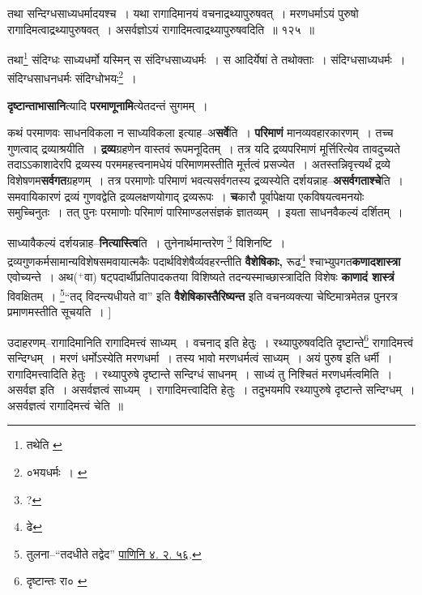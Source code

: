 \documentclass[article,12pt,a4paper]{memoir}
\newcommand{\add}[1]{($^{+}$#1)}
\begin{document}
	  \bigskip
	  \begingroup
	

	  \pstart तथा सन्दिग्धसाध्यधर्मादयश्च । यथा रागादिमानयं वचनाद्रथ्यापुरुषवत् । मरणधर्माऽयं पुरुषो रागादिमत्वाद्रथ्यापुरुषवत् । असर्वज्ञोऽयं रागादिमत्वाद्रथ्यापुरुषवदिति ॥ १२५ ॥
	\pend
      
	  \endgroup
	 

	  \pstart तथा\footnote{तथेति \cite{dp-edE}} संदिग्धः साध्यधर्मो यस्मिन् स संदिग्धसाध्यधर्मः । स आदिर्येषां ते तथोक्ताः । संदिग्धसाध्यधर्मः । संदिग्धसाधनधर्मः संदिग्धोभयः\footnote{०भयधर्मः । \cite{dp-msC}} ।
	\pend
      
	  \endgroup
	

	  \pstart \textbf{दृष्टान्ताभासानि}त्यादि \textbf{परमाणूनामि}त्येतदन्तं सुगमम् ।
	\pend
      

	  \pstart कथं परमाणवः साधनविकला न साध्यविकला इत्याह--अ\textbf{सर्वे}ति । \textbf{परिमाणं} मानव्यवहारकारणम् । तच्च गुणत्वाद् द्रव्याश्रयीति । \textbf{द्रव्य}ग्रहणेन वास्तवं रूपमनूदितम् । तत्र यदि द्रव्यपरिमाणं मूर्त्तिरित्येव तावदुच्यते तदाऽऽकाशादेरपि द्रव्यस्य परममहत्त्वनामधेयं परिमाणमस्तीति मूर्त्तत्वं प्रसज्येत । अतस्तन्निवृत्त्यर्थं द्रव्ये विशेषणम\textbf{सर्वगत}ग्रहणम् । तत्र परमाणोः परिमाणं भवत्यसर्वगतस्य द्रव्यस्येति दर्शयन्नाह--\textbf{असर्वगताश्चे}ति । समवायिकारणं द्रव्यं गुणवद्वेति द्रव्यलक्षणयोगाद् द्रव्यरूपः । \textbf{च}कारौ पूर्वापेक्षया एकविषयत्वमनयोः समुच्चिनुतः । तत् पुनः परमाणोः परिमाणं पारिमाण्डलसंज्ञकं ज्ञातव्यम् । इयता साधनवैकल्यं दर्शितम् ।
	\pend
      

	  \pstart साध्यावैकल्यं दर्शयन्नाह--\textbf{नित्यास्त्वि}ति । तुनेनार्थमान्तरेण \footnote{?} विशिनष्टि । द्रव्यगुणकर्मसामान्यविशेषसमवायात्मकैः पदार्थविशेषैर्व्यवहरन्तीति \textbf{वैशेषिकाः,} रूढ\footnote{ढे} श्चाभ्युपगत\textbf{कणादशास्त्रा} एवोच्यन्ते । अथ\add{वा} षट्पदार्थीप्रतिपादकतया विशिष्यते तदन्यस्माच्छास्त्रादिति विशेषः \textbf{काणादं शास्त्रं} विवक्षितम् । \footnote{तुलना--“तदधीते तद्वेद” \href{http://http://sarit.indology.info/?cref=Pā.4.3.59}{पाणिनि ४. २. ५६}.}“तद् विदन्त्यधीयते वा” इति \textbf{वैशेषिकास्तैरिष्यन्त} इति वचनव्यक्त्या चेष्टिमात्रमेतन्न पुनरत्र प्रमाणमस्तीति सूचयति ।
	\pend
      [[दिति साध्य० \cite{dp-msB} \cite{dp-edP} \cite{dp-edH} \cite{dp-edE} \cite{dp-edN}]]
	  \bigskip
	  \begingroup
	

	  \pstart उदाहरणम्--रागादिमानिति रागादिमत्त्वं साध्यम् । वचनाद् इति हेतुः । रथ्यापुरुषवदिति दृष्टान्ते\footnote{दृष्टान्तः रा० \cite{dp-msA} \cite{dp-msB} \cite{dp-msD} \cite{dp-edP} \cite{dp-edH} \cite{dp-edE} \cite{dp-edN}} रागादिमत्त्वं सन्दिग्धम् । मरणं धर्मोऽस्येति मरणधर्मा । तस्य भावो मरणधर्मत्वं साध्यम् । अयं पुरुष इति धर्मी । रागादिमत्त्वादिति हेतुः । रथ्यापुरुषे दृष्टान्ते सन्दिग्धं साधनम् । साध्यं तु निश्चितं मरणधर्मत्वमिति । असर्वज्ञ इति । असर्वज्ञत्वं साध्यम् । रागादिमत्त्वादिति हेतुः । तदुभयमपि रथ्यापुरुषे दृष्टान्ते सन्दिग्धम् । असर्वज्ञत्वं रागादिमत्त्वं चेति ॥
	\pend
       
\end{document}
